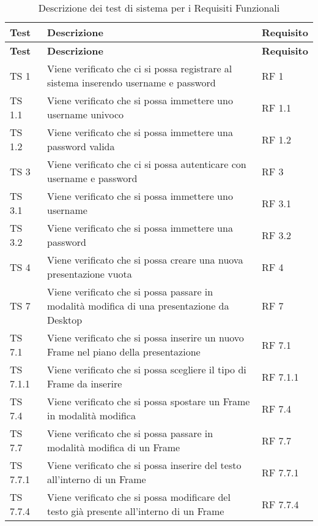 {{	
		\renewcommand*{\arraystretch}{1.4}
		\begin{longtable} [c]{| p{3cm} | p{6cm} |p{3cm}|}
			\caption{Descrizione dei test di sistema per i Requisiti Funzionali
			 \label{tab:verReqFunz}}\\
			 \hline
			 \textbf{Test} & \textbf{Descrizione} & \textbf{Requisito} \\
			 \hline
			 \endfirsthead
			 \hline
			 \textbf{Test} & \textbf{Descrizione} & \textbf{Requisito} \\
			 \hline
			\endhead
			 \hline
			 \endfoot
			 \hline
			 \endlastfoot
			TS 1 & Viene verificato che ci si possa registrare al sistema inserendo username e password & RF 1\\
			\hline
			TS 1.1 & Viene verificato che si possa immettere uno username univoco & RF 1.1\\
			\hline
			TS 1.2 & Viene verificato che si possa immettere una password valida & RF 1.2\\
			\hline
			TS 3 & Viene verificato che ci si possa autenticare con username e password & RF 3\\
			\hline
			TS 3.1 & Viene verificato che si possa immettere uno username & RF 3.1\\
			\hline
			TS 3.2 & Viene verificato che si possa immettere una password & RF 3.2\\
			\hline
			TS 4 & Viene verificato che si possa creare una nuova presentazione vuota & RF 4\\
			\hline
			TS 7 & Viene verificato che si possa passare in modalità modifica di una presentazione da Desktop\ped{g} & RF 7\\
			\hline
			TS 7.1 & Viene verificato che si possa inserire un nuovo Frame\ped{g} nel piano della presentazione\ped{g} & RF 7.1\\
			\hline
			TS 7.1.1 & Viene verificato che si possa scegliere il tipo di Frame\ped{g} da inserire & RF 7.1.1\\
			\hline
			TS 7.4 & Viene verificato che si possa spostare un Frame\ped{g} in modalità modifica & RF 7.4\\
			\hline
			TS 7.7 & Viene verificato che si possa passare in modalità modifica di un Frame\ped{g} & RF 7.7\\
			\hline
			TS 7.7.1 & Viene verificato che si possa inserire del testo all'interno di un Frame\ped{g} & RF 7.7.1\\
			\hline
			TS 7.7.4 & Viene verificato che si possa modificare del testo già presente all'interno di un Frame\ped{g} & RF 7.7.4\\

\end{longtable}}}
